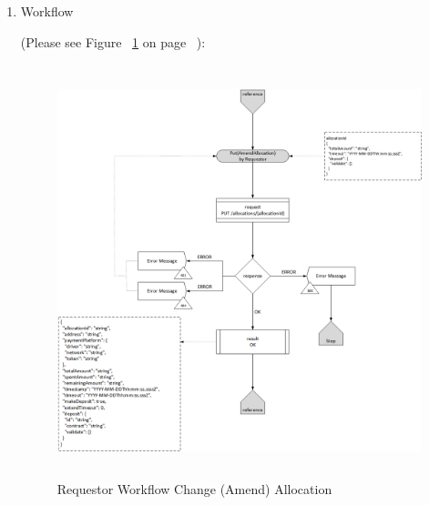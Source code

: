 \begin{enumerate}
\begin{table}[H]
\begin{center}
\begin{tabular}{|p{3cm}|l|p{3cm}|p{3cm}|p{4cm}|}
\end{tabular}
\end{center}
\end{table}

\item Workflow

(Please see Figure ~\ref{fig:RChA} on page ~\pageref{fig:RChA}):

\begin{figure}[htbp]
    \centering
    \includegraphics[width=12cm,height=12cm,angle=0]{./diag/Workflow/Payment/Put(AmendAllocation)-R-Workflow.png}
    \caption{Requestor Workflow Change (Amend) Allocation }
	\label{fig:RChA}
\end{figure}


\end{enumerate}

\newpage



